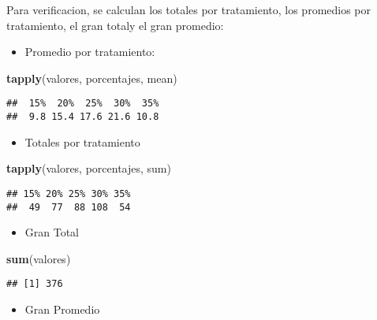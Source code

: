 \documentclass[]{article}
\newenvironment{Shaded}{\begin{snugshade}}{\end{snugshade}}
\newcommand{\KeywordTok}[1]{\textcolor[rgb]{0.13,0.29,0.53}{\textbf{#1}}}
\newcommand{\NormalTok}[1]{#1}
\providecommand{\tightlist}{%
  \setlength{\itemsep}{0pt}\setlength{\parskip}{0pt}}
\begin{document}
Para verificacion, se calculan los totales por tratamiento, los
promedios por tratamiento, el gran totaly el gran promedio:

\begin{itemize}
\tightlist
\item
  Promedio por tratamiento:
\end{itemize}

\begin{Shaded}
\begin{Highlighting}[]
\KeywordTok{tapply}\NormalTok{(valores, porcentajes, mean)}
\end{Highlighting}
\end{Shaded}

\begin{verbatim}
##  15%  20%  25%  30%  35% 
##  9.8 15.4 17.6 21.6 10.8
\end{verbatim}

\begin{itemize}
\tightlist
\item
  Totales por tratamiento
\end{itemize}

\begin{Shaded}
\begin{Highlighting}[]
\KeywordTok{tapply}\NormalTok{(valores, porcentajes, sum)}
\end{Highlighting}
\end{Shaded}

\begin{verbatim}
## 15% 20% 25% 30% 35% 
##  49  77  88 108  54
\end{verbatim}

\begin{itemize}
\tightlist
\item
  Gran Total
\end{itemize}

\begin{Shaded}
\begin{Highlighting}[]
\KeywordTok{sum}\NormalTok{(valores)}
\end{Highlighting}
\end{Shaded}

\begin{verbatim}
## [1] 376
\end{verbatim}

\begin{itemize}
\tightlist
\item
  Gran Promedio
\end{itemize}
\end{document}
